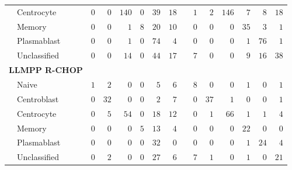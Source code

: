 \begin{table}[!tbp]
\begin{adjustwidth}{-1in}{0in}
{\begin{center}
\begin{tabular}{lrrrrrrcrrrrrr}
~~Centrocyte&$0$&$ 0$&$140$&$0$&$39$&$18$&&$ 1$&$ 2$&$146$&$ 7$&$ 8$&$18$\tabularnewline
~~Memory&$0$&$ 0$&$  1$&$8$&$20$&$10$&&$ 0$&$ 0$&$  0$&$35$&$ 3$&$ 1$\tabularnewline
~~Plasmablast&$0$&$ 0$&$  1$&$0$&$74$&$ 4$&&$ 0$&$ 0$&$  0$&$ 1$&$76$&$ 1$\tabularnewline
~~Unclassified&$0$&$ 0$&$ 14$&$0$&$44$&$17$&&$ 7$&$ 0$&$  0$&$ 9$&$16$&$38$\tabularnewline
\hline
{\bfseries LLMPP R-CHOP}&&&&&&&&&&&&&\tabularnewline
~~Naive&$1$&$ 2$&$  0$&$0$&$ 5$&$ 6$&&$ 8$&$ 0$&$  0$&$ 1$&$ 0$&$ 1$\tabularnewline
~~Centroblast&$0$&$32$&$  0$&$0$&$ 2$&$ 7$&&$ 0$&$37$&$  1$&$ 0$&$ 0$&$ 1$\tabularnewline
~~Centrocyte&$0$&$ 5$&$ 54$&$0$&$18$&$12$&&$ 0$&$ 1$&$ 66$&$ 1$&$ 1$&$ 4$\tabularnewline
~~Memory&$0$&$ 0$&$  0$&$5$&$13$&$ 4$&&$ 0$&$ 0$&$  0$&$22$&$ 0$&$ 0$\tabularnewline
~~Plasmablast&$0$&$ 0$&$  0$&$0$&$32$&$ 0$&&$ 0$&$ 0$&$  0$&$ 1$&$24$&$ 4$\tabularnewline
~~Unclassified&$0$&$ 2$&$  0$&$0$&$27$&$ 6$&&$ 7$&$ 1$&$  0$&$ 1$&$ 0$&$21$\tabularnewline
\hline
\end{tabular}\end{center}}
\end{adjustwidth}
\end{table}
